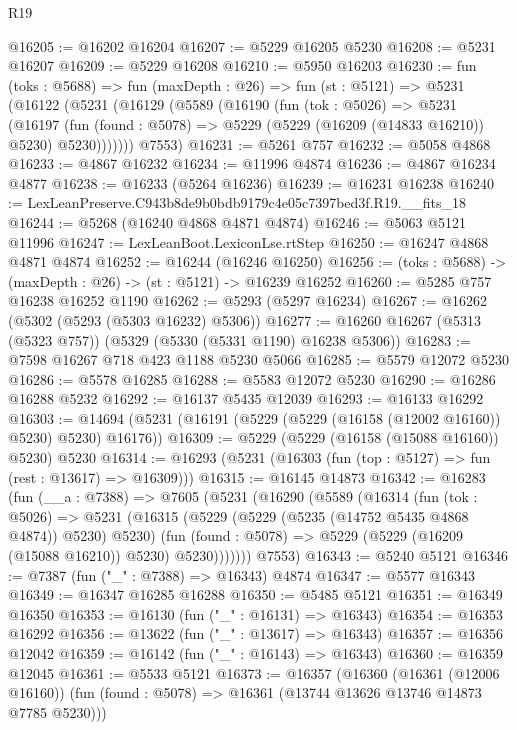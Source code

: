 \begin{lexlean}{R19}
\begin{coremodule}
@16205 := @16202 @16204
@16207 := @5229 @16205 @5230
@16208 := @5231 @16207
@16209 := @5229 @16208
@16210 := @5950 @16203
@16230 := fun (toks : @5688) =>
  fun (maxDepth : @26) =>
  fun (st : @5121) =>
  @5231
    (@16122
      (@5231
        (@16129
          (@5589
            (@16190
              (fun (tok : @5026) =>
              @5231
                (@16197
                  (fun (found : @5078) => @5229 (@5229 (@16209 (@14833 @16210)) @5230) @5230)))))))
      @7553)
@16231 := @5261 @757
@16232 := @5058 @4868
@16233 := @4867 @16232
@16234 := @11996 @4874
@16236 := @4867 @16234 @4877
@16238 := @16233 (@5264 @16236)
@16239 := @16231 @16238
@16240 := LexLeanPreserve.C943b8de9b0bdb9179c4e05c7397bed3f.R19.__fits_18
@16244 := @5268 (@16240 @4868 @4871 @4874)
@16246 := @5063 @5121 @11996
@16247 := LexLeanBoot.LexiconLse.rtStep
@16250 := @16247 @4868 @4871 @4874
@16252 := @16244 (@16246 @16250)
@16256 := (toks : @5688) -> (maxDepth : @26) -> (st : @5121) -> @16239 @16252
@16260 := @5285 @757 @16238 @16252 @1190
@16262 := @5293 (@5297 @16234)
@16267 := @16262 (@5302 (@5293 (@5303 @16232) @5306))
@16277 := @16260 @16267 (@5313 (@5323 @757)) (@5329 (@5330 (@5331 @1190) @16238 @5306))
@16283 := @7598 @16267 @718 @423 @1188 @5230 @5066
@16285 := @5579 @12072 @5230
@16286 := @5578 @16285
@16288 := @5583 @12072 @5230
@16290 := @16286 @16288 @5232
@16292 := @16137 @5435 @12039
@16293 := @16133 @16292
@16303 := @14694 (@5231 (@16191 (@5229 (@5229 (@16158 (@12002 @16160)) @5230) @5230) @16176))
@16309 := @5229 (@5229 (@16158 (@15088 @16160)) @5230) @5230
@16314 := @16293 (@5231 (@16303 (fun (top : @5127) => fun (rest : @13617) => @16309)))
@16315 := @16145 @14873
@16342 := @16283
    (fun (__a : @7388) =>
    @7605
      (@5231
        (@16290
          (@5589
            (@16314
              (fun (tok : @5026) =>
              @5231
                (@16315
                  (@5229 (@5229 (@5235 (@14752 @5435 @4868 @4874)) @5230) @5230)
                  (fun (found : @5078) => @5229 (@5229 (@16209 (@15088 @16210)) @5230) @5230)))))))
      @7553)
@16343 := @5240 @5121
@16346 := @7387 (fun ("_" : @7388) => @16343) @4874
@16347 := @5577 @16343
@16349 := @16347 @16285 @16288
@16350 := @5485 @5121
@16351 := @16349 @16350
@16353 := @16130 (fun ("_" : @16131) => @16343)
@16354 := @16353 @16292
@16356 := @13622 (fun ("_" : @13617) => @16343)
@16357 := @16356 @12042
@16359 := @16142 (fun ("_" : @16143) => @16343)
@16360 := @16359 @12045
@16361 := @5533 @5121
@16373 := @16357
    (@16360
      (@16361 (@12006 @16160))
      (fun (found : @5078) => @16361 (@13744 @13626 @13746 @14873 @7785 @5230)))

\end{coremodule}
\end{lexlean}
